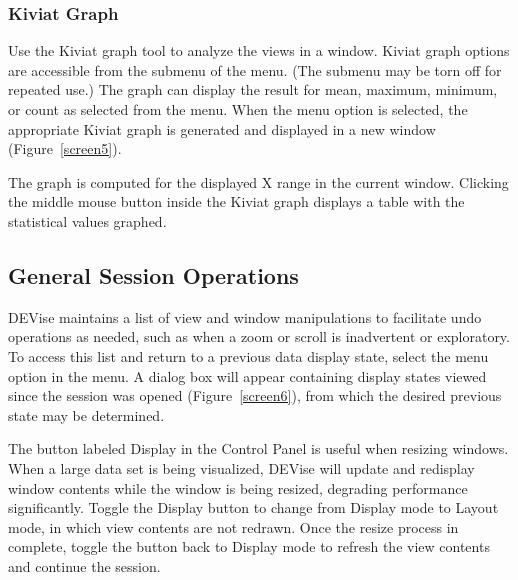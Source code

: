 
\subsubsection{Kiviat Graph}
	
Use the Kiviat graph tool to analyze the views in a window. Kiviat graph options
are accessible from the  submenu of the  menu.
(The submenu may be torn off for repeated use.) The graph can display the result
for mean, maximum, minimum, or count as selected from the menu. When the
 menu option is selected, the appropriate Kiviat graph is generated
and displayed in a new window (Figure~\ref{screen5}).

The graph is computed for the displayed X range in the current window. Clicking
the middle mouse button inside the Kiviat graph displays a table with the
statistical values graphed.



\subsection{General Session Operations}

DEVise maintains a list of view and window manipulations to facilitate undo
operations as needed, such as when a zoom or scroll is inadvertent or
exploratory. To access this list and return to a previous data display state,
select the  menu option in the  menu. A dialog box will
appear containing display states viewed since the session was opened
(Figure~\ref{screen6}), from which the desired previous state may be determined.


The button labeled Display in the Control Panel is useful when resizing windows.
When a large data set is being visualized, DEVise will update and redisplay
window contents while the window is being resized, degrading performance
significantly. Toggle the Display button to change from Display mode to Layout
mode, in which view contents are not redrawn. Once the resize process in
complete, toggle the button back to Display mode to refresh the view contents
and continue the session.

